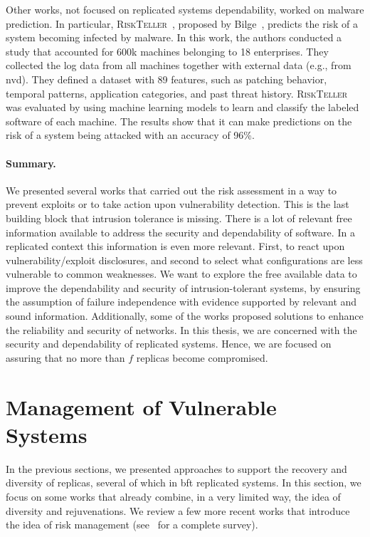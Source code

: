 Other works, not focused on replicated systems dependability, worked on malware prediction. 
In particular, \textsc{RiskTeller}~\cite{Bilge:2017}, proposed by Bilge~\etal{}, predicts the risk of a system becoming infected by malware.
In this work, the authors conducted a study that accounted for 600k machines belonging to 18 enterprises.
They collected the log data from all machines together with external data (e.g., from \gls{nvd}).
They defined a dataset with 89 features, such as patching behavior, temporal patterns, application categories, and past threat history.
\textsc{RiskTeller} was evaluated by using machine learning models to learn and classify the labeled software of each machine.
The results show that it can make predictions on the risk of a system being attacked with an accuracy of 96\%. 


\paragraph{Summary.} 
We presented several works that carried out the risk assessment in a way to prevent exploits or to take action upon vulnerability detection. 
This is the last building block that intrusion tolerance is missing. 
There is a lot of relevant free information available to address the security and dependability of software. 
In a replicated context this information is even more relevant. 
First, to react upon vulnerability/exploit disclosures, and second to select what configurations are less vulnerable to common weaknesses. 
We want to explore the free available data to improve the dependability and security of intrusion-tolerant systems, by ensuring the assumption of failure independence with evidence supported by relevant and sound information.
Additionally, some of the works proposed solutions to enhance the reliability and security of networks. 
In this thesis, we are concerned with the security and dependability of replicated systems. 
Hence, we are focused on assuring that no more than $f$ replicas become compromised.


\section{Management of Vulnerable Systems}
In the previous sections, we presented approaches to support the recovery and diversity of replicas, several of which in \gls{bft} replicated systems.
In this section, we focus on some works that already combine, in a very limited way, the idea of diversity and rejuvenations.
We review a few more recent works that introduce the idea of risk management (see~\cite{Yuan:2014} for a complete survey).


